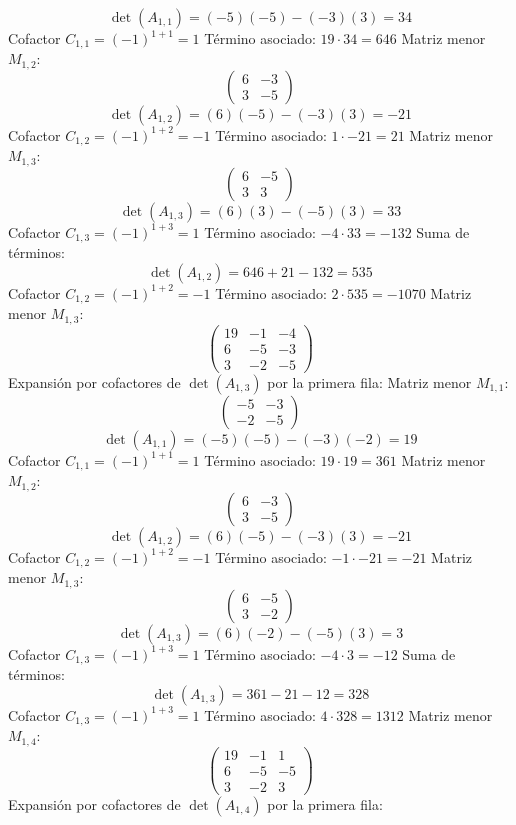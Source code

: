 \documentclass{article}
\begin{document}
\[\det(A_{1,1}) = (-5)(-5) - (-3)(3) = 34\]
Cofactor $C_{1,1} = (-1)^{1+1} = 1$
Término asociado: $ 19 \cdot 34 = 646 $
Matriz menor $M_{1,2}$:
\[\begin{pmatrix}6 & -3 \\ 3 & -5\end{pmatrix}\]
\[\det(A_{1,2}) = (6)(-5) - (-3)(3) = -21\]
Cofactor $C_{1,2} = (-1)^{1+2} = -1$
Término asociado: $ 1 \cdot -21 = 21 $
Matriz menor $M_{1,3}$:
\[\begin{pmatrix}6 & -5 \\ 3 & 3\end{pmatrix}\]
\[\det(A_{1,3}) = (6)(3) - (-5)(3) = 33\]
Cofactor $C_{1,3} = (-1)^{1+3} = 1$
Término asociado: $ -4 \cdot 33 = -132 $
Suma de términos:
\[\det(A_{1,2}) = 646 + 21 - 132 = 535\]
Cofactor $C_{1,2} = (-1)^{1+2} = -1$
Término asociado: $ 2 \cdot 535 = -1070 $
Matriz menor $M_{1,3}$:
\[\begin{pmatrix}19 & -1 & -4 \\ 6 & -5 & -3 \\ 3 & -2 & -5\end{pmatrix}\]
Expansión por cofactores de $\det(A_{1,3})$ por la primera fila:
Matriz menor $M_{1,1}$:
\[\begin{pmatrix}-5 & -3 \\ -2 & -5\end{pmatrix}\]
\[\det(A_{1,1}) = (-5)(-5) - (-3)(-2) = 19\]
Cofactor $C_{1,1} = (-1)^{1+1} = 1$
Término asociado: $ 19 \cdot 19 = 361 $
Matriz menor $M_{1,2}$:
\[\begin{pmatrix}6 & -3 \\ 3 & -5\end{pmatrix}\]
\[\det(A_{1,2}) = (6)(-5) - (-3)(3) = -21\]
Cofactor $C_{1,2} = (-1)^{1+2} = -1$
Término asociado: $ -1 \cdot -21 = -21 $
Matriz menor $M_{1,3}$:
\[\begin{pmatrix}6 & -5 \\ 3 & -2\end{pmatrix}\]
\[\det(A_{1,3}) = (6)(-2) - (-5)(3) = 3\]
Cofactor $C_{1,3} = (-1)^{1+3} = 1$
Término asociado: $ -4 \cdot 3 = -12 $
Suma de términos:
\[\det(A_{1,3}) = 361 - 21 - 12 = 328\]
Cofactor $C_{1,3} = (-1)^{1+3} = 1$
Término asociado: $ 4 \cdot 328 = 1312 $
Matriz menor $M_{1,4}$:
\[\begin{pmatrix}19 & -1 & 1 \\ 6 & -5 & -5 \\ 3 & -2 & 3\end{pmatrix}\]
Expansión por cofactores de $\det(A_{1,4})$ por la primera fila:
\end{document}
